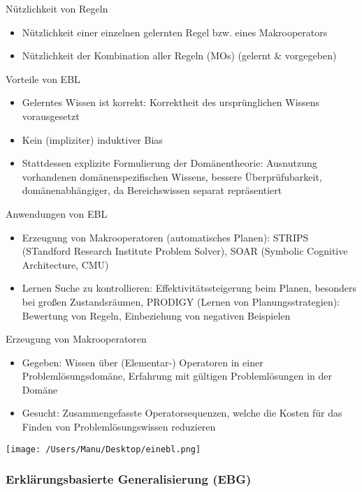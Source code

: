 \documentclass[paper=a4, fontsize=11pt]{scrartcl} %
\numberwithin{equation}{section} %
\numberwithin{figure}{section} %
\numberwithin{table}{section} %
\begin{document}
Nützlichkeit von Regeln
\begin{itemize}
\item Nützlichkeit einer einzelnen gelernten Regel bzw. eines Makrooperators
\item Nützlichkeit der Kombination aller Regeln (MOs) (gelernt \& vorgegeben)
\end{itemize}

Vorteile von EBL
\begin{itemize}
\item Gelerntes Wissen ist korrekt: Korrektheit des ursprünglichen Wissens vorausgesetzt
\item Kein (impliziter) induktiver Bias
\item Stattdessen explizite Formulierung der Domänentheorie: Ausnutzung vorhandenen domänenspezifischen Wissens, bessere Überprüfubarkeit, domänenabhängiger, da Bereichswissen separat repräsentiert
\end{itemize}

Anwendungen von EBL
\begin{itemize}
\item Erzeugung von Makrooperatoren (automatisches Planen): STRIPS (STandford Research Institute Problem Solver), SOAR (Symbolic Cognitive Architecture, CMU)
\item Lernen Suche zu kontrollieren: Effektivitätssteigerung beim Planen, besonders bei großen Zustandsräumen, PRODIGY (Lernen von Planungsstrategien): Bewertung von Regeln, Einbeziehung von negativen Beispielen
\end{itemize}

Erzeugung von Makrooperatoren
\begin{itemize}
\item Gegeben: Wissen über (Elementar-) Operatoren in einer Problemlösungsdomäne, Erfahrung mit gültigen Problemlösungen in der Domäne
\item Gesucht: Zusammengefasste Operatorsequenzen, welche die Kosten für das Finden von Problemlösungswissen reduzieren
\end{itemize}

\texttt{[image: /Users/Manu/Desktop/einebl.png]}

\subsubsection{Erklärungsbasierte Generalisierung (EBG)}
\end{document}
